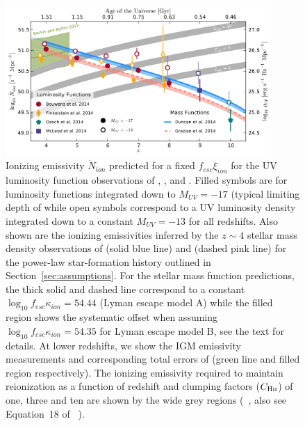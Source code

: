 \begin{figure}
  \includegraphics[width=0.9\textwidth]{plots/Fig8.pdf}
  \caption{Ionizing emissivity $\dot{N}_{ion}$ predicted for a fixed $f_{esc}\xi_{ion}$ for the UV luminosity function observations of \citet{Bouwens:2014tx}, \citet{Oesch:2014cs}, \citet{Finkelstein:2014ub} and \citet{McLeod:2014wz}. Filled symbols are for luminosity functions integrated down to $M_{UV} = -17$ (typical limiting depth of  while open symbols correspond to a UV luminosity density integrated down to a constant $M_{UV} = -13$ for all redshifts. Also shown are the ionizing emissivities inferred by the $z\sim4$ stellar mass density observations of \citet{Duncan:2014gh} (solid blue line) and \citet{Grazian:2014vx} (dashed pink line) for the power-law star-formation history  outlined in Section~\ref{sec:assumptions}. For the stellar mass function predictions, the thick solid and dashed line correspond to a constant $\log_{10}f_{esc}\kappa_{ion} = 54.44$ (Lyman escape model A) while the filled region shows the systematic offset when assuming $\log_{10}f_{esc}\kappa_{ion} = 54.35$ for Lyman escape model B, see the text for details. At lower redshifts, we show the IGM emissivity measurements and corresponding total errors of \citet{Becker:2013hc} (green line and filled region respectively). The ionizing emissivity required to maintain reionization as a function of redshift and clumping factors ($C_{\textsc{Hii}}$) of one, three and ten are shown by the wide grey regions (\citeauthor{Madau:1999kl}~\citeyear{Madau:1999kl}, also see Equation~18 of \citeauthor{Bolton:2007gc}~\citeyear{Bolton:2007gc}).}
  \label{fig:Nion_constant}
\end{figure}

